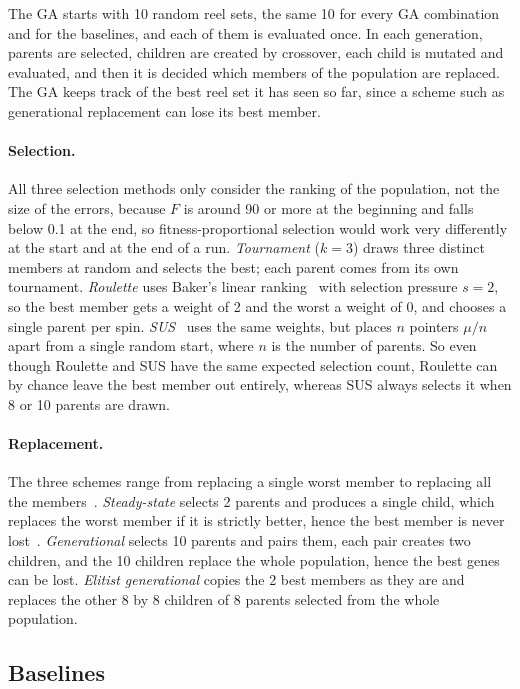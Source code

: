 The GA starts with 10 random reel sets, the same 10 for every GA combination and for the baselines, and each of them is evaluated once. In each generation, parents are selected, children are created by crossover, each child is mutated and evaluated, and then it is decided which members of the population are replaced. The GA keeps track of the best reel set it has seen so far, since a scheme such as generational replacement can lose its best member.

\paragraph{Selection.}
All three selection methods only consider the ranking of the population, not the size of the errors, because $F$ is around 90 or more at the beginning and falls below 0.1 at the end, so fitness-proportional selection would work very differently at the start and at the end of a run. \emph{Tournament} ($k = 3$) draws three distinct members at random and selects the best; each parent comes from its own tournament. \emph{Roulette} uses Baker's linear ranking~\cite{baker1985adaptive} with selection pressure $s = 2$, so the best member gets a weight of 2 and the worst a weight of 0, and chooses a single parent per spin. \emph{SUS}~\cite{baker1987reducing} uses the same weights, but places $n$ pointers $\mu/n$ apart from a single random start, where $n$ is the number of parents. So even though Roulette and SUS have the same expected selection count, Roulette can by chance leave the best member out entirely, whereas SUS always selects it when 8 or 10 parents are drawn.

\paragraph{Replacement.}
The three schemes range from replacing a single worst member to replacing all the members~\cite{dejong1993generation}. \emph{Steady-state} selects 2 parents and produces a single child, which replaces the worst member if it is strictly better, hence the best member is never lost~\cite{whitley1989genitor,syswerda1991study}. \emph{Generational} selects 10 parents and pairs them, each pair creates two children, and the 10 children replace the whole population, hence the best genes can be lost. \emph{Elitist generational} copies the 2 best members as they are and replaces the other 8 by 8 children of 8 parents selected from the whole population.

\subsection{Baselines}
\label{sec:baselines}

